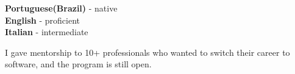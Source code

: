 \documentclass[9pt]{developercv} %
\begin{document}
\begin{minipage}[t]{0.5\textwidth}
	\vspace{-\baselineskip} %

	
	\textbf{Portuguese(Brazil)} - native\\
	\textbf{English} - proficient\\
	\textbf{Italian} - intermediate
\end{minipage}
\hfill
\begin{minipage}[t]{0.5\textwidth}
	\vspace{-\baselineskip} %
	
	
	I gave mentorship to 10+ professionals who wanted to switch their career to software, and the program is still open. 
\end{minipage}

\end{document}
